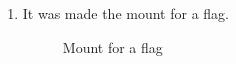 \begin{enumerate}
	\item It was made the mount for a flag.
	\begin{figure}[H]
		\begin{minipage}[h]{0.47\linewidth}
		\end{minipage}
		\hfill
		\begin{minipage}[h]{0.47\linewidth}
		\end{minipage}
		\caption{Mount for a flag}
	\end{figure}
	

\end{enumerate}
